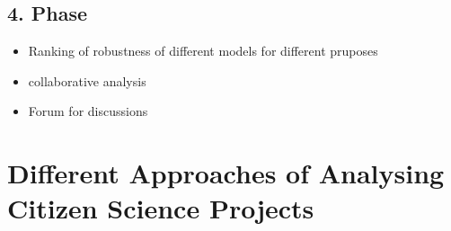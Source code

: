 \subsection{4. Phase}

\begin{itemize}
    \item Ranking of robustness of different models for different pruposes
    \item collaborative analysis
    \item Forum for discussions 
\end{itemize}

\section{Different Approaches of Analysing Citizen Science Projects}
